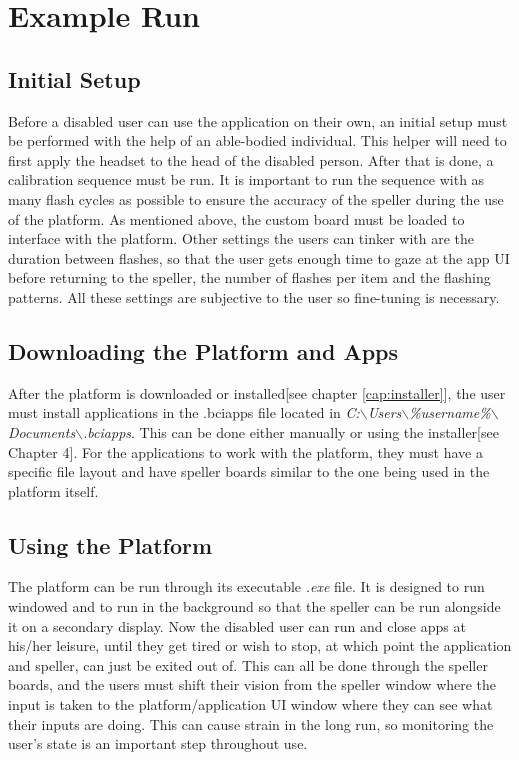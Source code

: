 \section{Example Run} \label{sect:Example Run}
\subsection{Initial Setup}
Before a disabled user can use the application on their own, an initial setup must be performed with the help of an able-bodied individual. This helper will need to first apply the headset to the head of the disabled person. After that is done, a calibration sequence must be run. It is important to run the sequence with as many flash cycles as possible to ensure the accuracy of the speller during the use of the platform. As mentioned above, the custom board must be loaded to interface with the platform. Other settings the users can tinker with are the duration between flashes, so that the user gets enough time to gaze at the app UI before returning to the speller, the number of flashes per item and the flashing patterns. All these settings are subjective to the user so fine-tuning is necessary.

\subsection{Downloading the Platform and Apps}
After the platform is downloaded or installed[see chapter \ref{cap:installer}], the user must install applications in the .bciapps file located in \textit{C:$\backslash$Users$\backslash$\%username\%$\backslash$Documents$\backslash$.bciapps}. This can be done either manually or using the installer[see Chapter 4]. For the applications to work with the platform, they must have a specific file layout and have speller boards similar to the one being used in the platform itself.
\subsection{Using the Platform}
The platform can be run through its executable \textit{.exe} file. It is designed to run windowed and to run in the background so that the speller can be run alongside it on a secondary display. Now the disabled user can run and close apps at his/her leisure, until they get tired or wish to stop, at which point the application and speller, can just be exited out of. This can all be done through the speller boards, and the users must shift their vision from the speller window where the input is taken to the platform/application UI window where they can see what their inputs are doing. This can cause strain in the long run, so monitoring the user's state is an important step throughout use.

